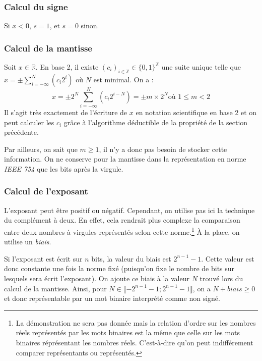 \documentclass[../../main.tex]{subfiles}
\begin{document}
\subsubsection{Calcul du signe}
Si $x < 0$, $s = 1$, et $s= 0$ sinon.
\subsubsection{Calcul de la mantisse}
Soit $x\in{\mathbb{R}}$.\newline
En base 2, il existe $(c_{i})_{i\in{\mathbb{Z}}}\in{\{0, 1\}^{\mathbb{Z}}}$ une suite unique telle que $x = \pm \displaystyle\sum_{i = -\infty}^{N}\left(c_{i}2^{i}\right)$ où $N$ est minimal.\newline
On a :
$$x = \pm 2^{N}\displaystyle\sum_{i = -\infty}^{N}\left(c_{i}2^{i-N}\right) = \pm m\times{2^{N}}\text{où $1 \leq m < 2$}$$
Il s'agit très exactement de l'écriture de $x$ en notation scientifique en base 2 et on peut calculer les $c_{i}$ grâce à l'algorithme déductible de la propriété de la section précédente.

Par ailleurs, on sait que $m\geq{1}$, il n'y a donc pas besoin de stocker cette information. On ne conserve pour la mantisse dans la représentation en norme \textit{IEEE 754} que les bits après la virgule.

\subsubsection{Calcul de l'exposant}
L'exposant peut être positif ou négatif. Cependant, on utilise pas ici la technique du complément à deux. En effet, cela rendrait plus complexe la comparaison entre deux nombres à virgules représentés selon cette norme.\footnote{La démonstration ne sera pas donnée mais la relation d'ordre sur les nombres réels représentés par les mots binaires est la même que celle sur les mots binaires réprésentant les nombres réels. C'est-à-dire qu'on peut indifférement comparer représentants ou représentés.} À la place, on utilise un \textit{biais}.

Si l'exposant est écrit sur $n$ bits, la valeur du biais est $2^{n-1} - 1$. Cette valeur est donc constante une fois la norme fixé (puisqu'on fixe le nombre de bits sur lesquels sera écrit l'exposant). On ajoute ce biais à la valeur $N$ trouvé lors du calcul de la mantisse. Ainsi, pour $N\in{\llbracket -2^{n-1} - 1; 2^{n-1}-1\rrbracket}$, on a $N + biais \geq{0}$ et donc représentable par un mot binaire interprété comme non signé.
\end{document}

